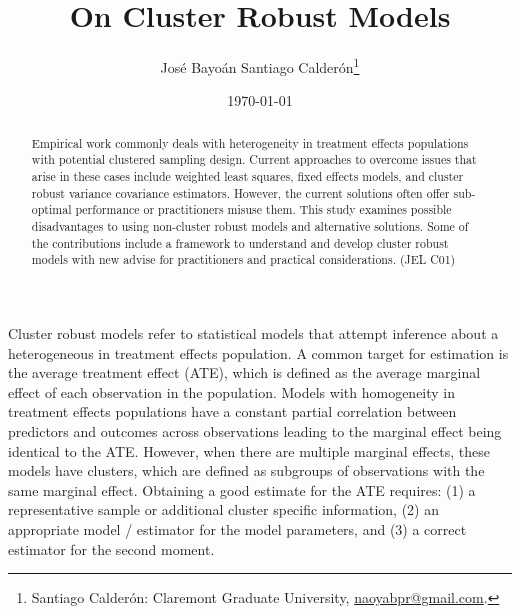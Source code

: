 \documentclass{jbsc}
\begin{document}
\title{On Cluster Robust Models}
\author{José Bayoán Santiago Calderón\thanks{Santiago Calderón: Claremont Graduate University, \href{mailto:naoyabpr@gmail.com}{naoyabpr@gmail.com}.}}
\date{\today}

\maketitle

\begin{abstract}
Empirical work commonly deals with heterogeneity in treatment effects populations with potential clustered sampling design. Current approaches to overcome issues that arise in these cases include weighted least squares, fixed effects models, and cluster robust variance covariance estimators. However, the current solutions often offer sub-optimal performance or practitioners misuse them. This study examines possible disadvantages to using non-cluster robust models and alternative solutions. Some of the contributions include a framework to understand and develop cluster robust models with new advise for practitioners and practical considerations. (JEL C01)
\end{abstract}

\doublespacing

Cluster robust models refer to statistical models that attempt inference about a heterogeneous in treatment effects population. A common target for estimation is the average treatment effect (ATE), which is defined as the average marginal effect of each observation in the population. Models with homogeneity in treatment effects populations have a constant partial correlation between predictors and outcomes across observations leading to the marginal effect being identical to the ATE. However, when there are multiple marginal effects, these models have clusters, which are defined as subgroups of observations with the same marginal effect. Obtaining a good estimate for the ATE requires: (1) a representative sample or additional cluster specific information, (2) an appropriate model / estimator for the model parameters, and (3) a correct estimator for the second moment.
\end{document}
